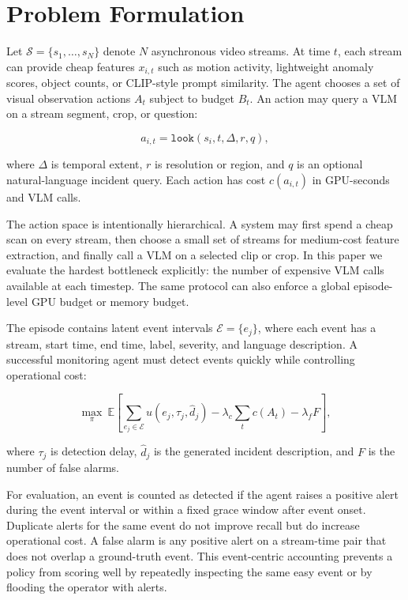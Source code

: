 \section{Problem Formulation}

Let $\mathcal{S}=\{s_1,\ldots,s_N\}$ denote $N$ asynchronous video streams. At time $t$, each stream can provide cheap features $x_{i,t}$ such as motion activity, lightweight anomaly scores, object counts, or CLIP-style prompt similarity. The agent chooses a set of visual observation actions $A_t$ subject to budget $B_t$. An action may query a VLM on a stream segment, crop, or question:

\[
a_{i,t} = \texttt{look}(s_i, t, \Delta, r, q),
\]

where $\Delta$ is temporal extent, $r$ is resolution or region, and $q$ is an optional natural-language incident query. Each action has cost $c(a_{i,t})$ in GPU-seconds and VLM calls.

The action space is intentionally hierarchical. A system may first spend a cheap scan on every stream, then choose a small set of streams for medium-cost feature extraction, and finally call a VLM on a selected clip or crop. In this paper we evaluate the hardest bottleneck explicitly: the number of expensive VLM calls available at each timestep. The same protocol can also enforce a global episode-level GPU budget or memory budget.

The episode contains latent event intervals $\mathcal{E}=\{e_j\}$, where each event has a stream, start time, end time, label, severity, and language description. A successful monitoring agent must detect events quickly while controlling operational cost:

\[
\max_{\pi} \ \mathbb{E}\left[\sum_{e_j \in \mathcal{E}} u(e_j, \tau_j, \hat{d}_j) - \lambda_c \sum_t c(A_t) - \lambda_f F\right],
\]

where $\tau_j$ is detection delay, $\hat{d}_j$ is the generated incident description, and $F$ is the number of false alarms.

For evaluation, an event is counted as detected if the agent raises a positive alert during the event interval or within a fixed grace window after event onset. Duplicate alerts for the same event do not improve recall but do increase operational cost. A false alarm is any positive alert on a stream-time pair that does not overlap a ground-truth event. This event-centric accounting prevents a policy from scoring well by repeatedly inspecting the same easy event or by flooding the operator with alerts.

